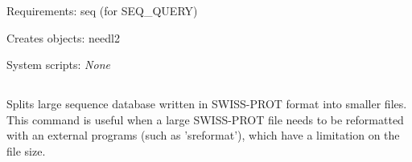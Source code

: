 \begin{description}
\begin{enumerate}
\end{enumerate}


\item{Requirements:} seq (for SEQ\_QUERY)


\item{Creates objects:} needl2


\item{System scripts:} {\em None}

\end{description}



\subsection[sprot\_split]{  }



Splits large sequence database written in SWISS-PROT format
into smaller files. This command is useful when a large SWISS-PROT
file needs to be reformatted with an external programs (such as
'sreformat'), which have a limitation on the file size. 


